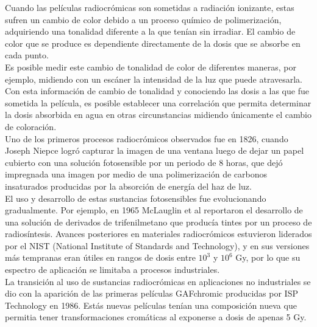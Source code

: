Cuando las películas radiocrómicas son sometidas a radiación ionizante, estas sufren un cambio de color debido a un proceso químico de polimerización, adquiriendo una tonalidad diferente a la que tenían sin irradiar. El cambio de color que se produce es dependiente directamente de la dosis que se absorbe en cada punto. \\

Es posible medir este cambio de tonalidad de color de diferentes maneras, por ejemplo, midiendo con un escáner la intensidad de la luz que puede atravesarla. Con esta información de cambio de tonalidad y conociendo las dosis a las que fue sometida la película, es posible establecer una correlación que permita determinar la dosis absorbida en agua en otras circunstancias midiendo únicamente el cambio de coloración. \\

Uno de los primeros procesos radiocrómicos observados fue en 1826, cuando Joseph Niepce logró capturar la imagen de una ventana luego de dejar un papel cubierto con una solución fotosensible por un periodo de 8 horas, que dejó impregnada una imagen por medio de una polimerización de carbonos insaturados producidas por la absorción de energía del haz de luz.\\

El uso y desarrollo de estas sustancias fotosensibles fue evolucionando gradualmente. Por ejemplo, en 1965 McLauglin et al \cite{McLaughlin1965} reportaron el desarrollo de una solución de derivados de trifenilmetano que producía tintes por un proceso de radiosíntesis. Avances posteriores en materiales radiocrómicos estuvieron liderados por el NIST (National Institute of Standards and Technology), y en sus versiones más tempranas eran útiles en rangos de dosis entre $10^3$ y $10^6$ Gy, por lo que su espectro de aplicación se limitaba a procesos industriales\cite{Williams2011}.\\

La transición al uso de sustancias radiocrómicas en aplicaciones no industriales se dio con la aparición de las primeras películas GAFchromic producidas por ISP Technology en 1986. Estás nuevas películas tenían una composición nueva que permitia tener transformaciones cromáticas al exponerse a dosis de apenas 5 Gy\cite{Williams2011}.\\


